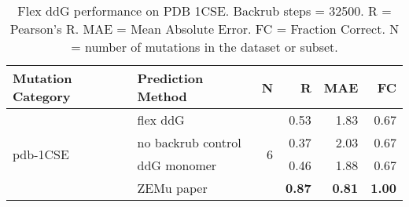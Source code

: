 \begin{table}
  \begin{tabular}{llrrrr}
\toprule
Mutation Category &   Prediction Method &  N &    R &  MAE &   FC \\
\midrule
 \multirow{ 4}{*}{pdb-1CSE} & flex ddG & \multirow{ 4}{*}{6} & 0.53 & 1.83 & 0.67  \\
 & no backrub control & & 0.37 & 2.03 & 0.67  \\
 & ddG monomer & & 0.46 & 1.88 & 0.67  \\
 & ZEMu paper & & \textbf{0.87} & \textbf{0.81} & \textbf{1.00}  \\
\bottomrule
\end{tabular}
  \caption[Flex ddG performance on PDB 1CSE]{
    Flex ddG performance on PDB 1CSE. Backrub steps = 32500. R = Pearson's R. MAE = Mean Absolute Error. FC = Fraction Correct. N = number of mutations in the dataset or subset.
  } \label{tab:table-pdb-1CSE}
\end{table}
